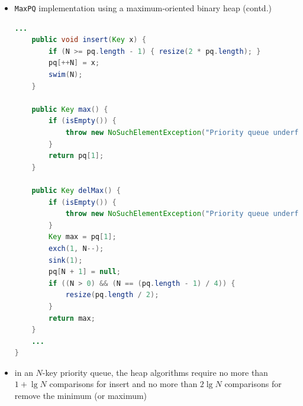 \documentclass[8pt,a4paper,compress]{beamer}
\begin{document}
\begin{frame}[fragile]
\begin{itemize}
\item \lstinline{MaxPQ} implementation using a maximum-oriented binary heap (contd.)
\begin{lstlisting}[language=Java]
    ...
    public void insert(Key x) {
        if (N >= pq.length - 1) { resize(2 * pq.length); }
        pq[++N] = x;
        swim(N);
    }
    
    public Key max() {
        if (isEmpty()) { 
            throw new NoSuchElementException("Priority queue underflow"); 
        }
        return pq[1];
    }

    public Key delMax() {
        if (isEmpty()) { 
            throw new NoSuchElementException("Priority queue underflow");
        }
        Key max = pq[1];
        exch(1, N--);
        sink(1);
        pq[N + 1] = null; 
        if ((N > 0) && (N == (pq.length - 1) / 4)) { 
            resize(pq.length / 2); 
        }
        return max;
    }
    ...
}
\end{lstlisting}

\item in an $N$-key priority queue, the heap algorithms require no more than $1 + \lg N$ comparisons for insert and no more than $2 \lg N$ comparisons for remove the minimum (or maximum)
\end{itemize}
\end{frame}
\end{document}
